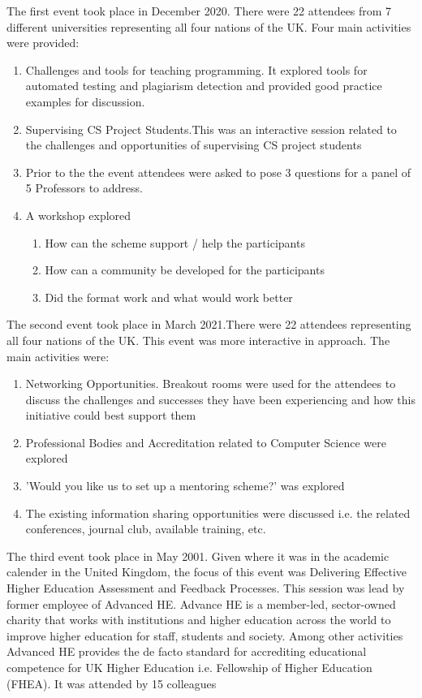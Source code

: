 \documentclass[sigconf]{acmart}
\begin{document}
The first event took place in December 2020. There were 22 attendees from 7 different universities representing all four nations of the UK. Four main activities were provided:
\begin{enumerate}
	\item Challenges and tools for teaching programming. It explored tools for automated testing and plagiarism detection and provided good practice examples for discussion.
	\item Supervising CS Project Students.This was an interactive session related to the challenges and opportunities of supervising CS project students
	\item Prior to the the event attendees were asked to pose 3 questions for a panel of 5 Professors to address. 
	\item A workshop explored
		\begin{enumerate}
			\item How can the scheme support / help the participants
			\item How can a community be developed for the participants
			\item Did the format work and what would work better
		\end{enumerate}
\end{enumerate}

The second event took place in March 2021.There were 22 attendees representing all four nations of the UK. This event was more interactive in approach. The main activities were:
\begin{enumerate}
	\item Networking Opportunities. Breakout rooms were used for the attendees to discuss the challenges and successes they have been experiencing and how this initiative could best support them
	\item Professional Bodies and Accreditation related to Computer Science were explored
	\item 'Would you like us to set up a mentoring scheme?' was explored
	\item The existing information sharing opportunities were discussed i.e. the related conferences, journal club, available training, etc. 
\end{enumerate}

The third event took place in May 2001. Given where it was in the academic calender in the United Kingdom, the focus of this event was Delivering Effective Higher Education Assessment and Feedback Processes. This session was lead by former employee of Advanced HE. Advance HE is a member-led, sector-owned charity that works with institutions and higher education across the world to improve higher education for staff, students and society. Among other activities Advanced HE provides the de facto standard for accrediting educational competence for UK Higher Education i.e. Fellowship of Higher Education (FHEA).  It was attended by 15 colleagues
\end{document}
